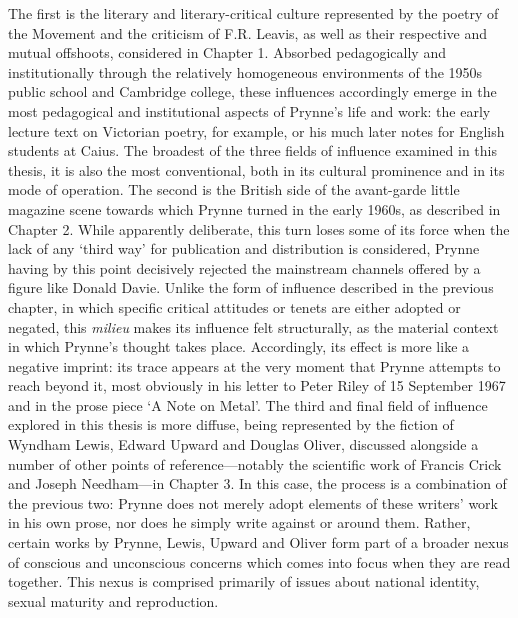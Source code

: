 \documentclass[]{article}
\begin{document}
The first is the literary and literary-critical culture represented by
the poetry of the Movement and the criticism of F.R. Leavis, as well as
their respective and mutual offshoots, considered in Chapter 1. Absorbed
pedagogically and institutionally through the relatively homogeneous
environments of the 1950s public school and Cambridge college, these
influences accordingly emerge in the most pedagogical and institutional
aspects of Prynne's life and work: the early lecture text on Victorian
poetry, for example, or his much later notes for English students at
Caius. The broadest of the three fields of influence examined in this
thesis, it is also the most conventional, both in its cultural
prominence and in its mode of operation. The second is the British side
of the avant-garde little magazine scene towards which Prynne turned in
the early 1960s, as described in Chapter 2. While apparently deliberate,
this turn loses some of its force when the lack of any `third way' for
publication and distribution is considered, Prynne having by this point
decisively rejected the mainstream channels offered by a figure like
Donald Davie. Unlike the form of influence described in the previous
chapter, in which specific critical attitudes or tenets are either
adopted or negated, this \emph{milieu} makes its influence felt
structurally, as the material context in which Prynne's thought takes
place. Accordingly, its effect is more like a negative imprint: its
trace appears at the very moment that Prynne attempts to reach beyond
it, most obviously in his letter to Peter Riley of 15 September 1967 and
in the prose piece `A Note on Metal'. The third and final field of
influence explored in this thesis is more diffuse, being represented by
the fiction of Wyndham Lewis, Edward Upward and Douglas Oliver,
discussed alongside a number of other points of reference---notably the
scientific work of Francis Crick and Joseph Needham---in Chapter 3. In
this case, the process is a combination of the previous two: Prynne does
not merely adopt elements of these writers' work in his own prose, nor
does he simply write against or around them. Rather, certain works by
Prynne, Lewis, Upward and Oliver form part of a broader nexus of
conscious and unconscious concerns which comes into focus when they are
read together. This nexus is comprised primarily of issues about
national identity, sexual maturity and reproduction.
\end{document}

